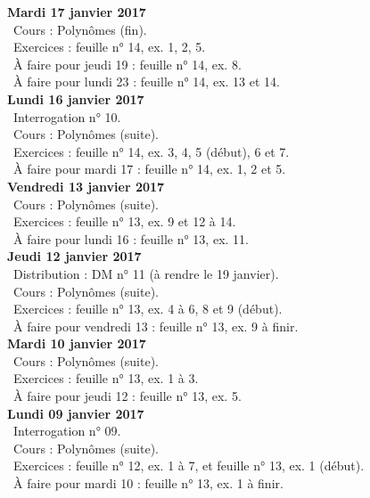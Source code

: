 \documentclass[12pt,a4paper]{article}
\begin{document}
\noindent\textbf{Mardi 17 janvier 2017}\\
\bu\ Cours : Polynômes (fin).\\
\bu\ Exercices : feuille n° 14, ex. 1, 2, 5.\\
\bu\ À faire pour jeudi 19 : feuille n° 14, ex. 8.\\  
\bu\ À faire pour lundi 23 : feuille n° 14, ex. 13 et 14.\vspace{.4cm}\\  
 
\noindent\textbf{ Lundi 16 janvier 2017}\\
\bu\ Interrogation n° 10.\\
\bu\ Cours : Polynômes (suite).\\
\bu\ Exercices : feuille n° 14, ex. 3, 4, 5 (début), 6 et 7.\\
\bu\ À faire pour mardi 17 : feuille n° 14, ex. 1, 2 et 5.\vspace{.4cm}\\  

\noindent\textbf{Vendredi 13 janvier 2017}\\
\bu\ Cours : Polynômes (suite).\\
\bu\ Exercices : feuille n° 13, ex. 9 et 12 à 14.\\
\bu\ À faire pour lundi 16 : feuille n° 13, ex. 11.\vspace{.4cm}\\

\noindent\textbf{Jeudi 12 janvier 2017}\\
\bu\ Distribution : DM n° 11 (à rendre le 19 janvier).\\
\bu\ Cours : Polynômes (suite).\\
\bu\ Exercices : feuille n° 13, ex. 4 à 6, 8 et 9 (début).\\
\bu\ À faire pour vendredi 13 : feuille n° 13, ex. 9 à finir.\vspace{.4cm}\\

\noindent\textbf{Mardi 10 janvier 2017} \\
\bu\ Cours : Polynômes (suite).\\
\bu\ Exercices : feuille n° 13, ex. 1 à 3.\\
\bu\ À faire pour jeudi 12 : feuille n° 13, ex. 5.\vspace{.4cm}\\
 
\noindent\textbf{ Lundi 09 janvier 2017} \\
\bu\ Interrogation n° 09.\\
\bu\ Cours : Polynômes (suite).\\
\bu\ Exercices : feuille n° 12, ex. 1 à 7, et feuille n° 13, ex. 1 (début).\\
\bu\ À faire pour mardi 10 : feuille n° 13, ex. 1 à finir.\vspace{.4cm}\\
\end{document}
